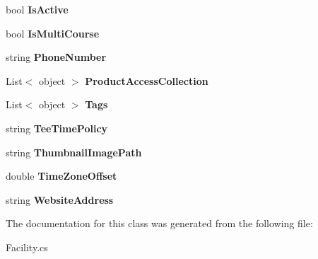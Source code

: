 \begin{DoxyCompactItemize}
\item 
\mbox{\label{class_golf_now_a_p_i_1_1_facility_a30c5c9b3bb965bbf43349afcee0b2d2d}} 
bool {\bfseries Is\+Active}
\item 
\mbox{\label{class_golf_now_a_p_i_1_1_facility_ad1fe80dcdc970efffb6dfe65407360e8}} 
bool {\bfseries Is\+Multi\+Course}
\item 
\mbox{\label{class_golf_now_a_p_i_1_1_facility_a2b00f03bdfd354e0cbbdb684280a2130}} 
string {\bfseries Phone\+Number}
\item 
\mbox{\label{class_golf_now_a_p_i_1_1_facility_aa440101ee47a64b9816dc8816857e04f}} 
List$<$ object $>$ {\bfseries Product\+Access\+Collection}
\item 
\mbox{\label{class_golf_now_a_p_i_1_1_facility_a9aab9888c7ef849009b8a10ca12885f4}} 
List$<$ object $>$ {\bfseries Tags}
\item 
\mbox{\label{class_golf_now_a_p_i_1_1_facility_a467e0f6c7492dde9098ee9c3134c65a2}} 
string {\bfseries Tee\+Time\+Policy}
\item 
\mbox{\label{class_golf_now_a_p_i_1_1_facility_a3045d37a2dc690a9bff5d81c5b7628ea}} 
string {\bfseries Thumbnail\+Image\+Path}
\item 
\mbox{\label{class_golf_now_a_p_i_1_1_facility_a78d91c7db9669efe7109289bbdb61466}} 
double {\bfseries Time\+Zone\+Offset}
\item 
\mbox{\label{class_golf_now_a_p_i_1_1_facility_a5f6b6464945004ab3035a1a147843994}} 
string {\bfseries Website\+Address}
\end{DoxyCompactItemize}


The documentation for this class was generated from the following file\+:\begin{DoxyCompactItemize}
\item 
Facility.\+cs\end{DoxyCompactItemize}

